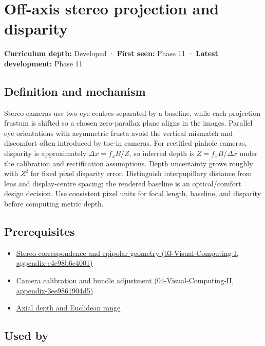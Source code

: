\hypertarget{appendix-0976e86e5b9f}{}
\section{Off-axis stereo projection and disparity}\label{appendix-0976e86e5b9f-off-axis-stereo-projection-and-disparity}

\textbf{Curriculum depth:} Developed · \textbf{First seen:} Phase 11 · \textbf{Latest development:} Phase 11

\subsection{Definition and mechanism}\label{appendix-0976e86e5b9f-definition-and-mechanism}

Stereo cameras use two eye centres separated by a baseline, while each projection frustum is shifted so a chosen zero-parallax plane aligns in the images. Parallel eye orientations with asymmetric frusta avoid the vertical mismatch and discomfort often introduced by toe-in cameras. For rectified pinhole cameras, disparity is approximately \(\Delta x=f_xB/Z\), so inferred depth is \(Z=f_xB/\Delta x\) under the calibration and rectification assumptions. Depth uncertainty grows roughly with \(Z^2\) for fixed pixel disparity error. Distinguish interpupillary distance from lens and display-centre spacing; the rendered baseline is an optical/comfort design decision. Use consistent pixel units for focal length, baseline, and disparity before computing metric depth.

\subsection{Prerequisites}\label{appendix-0976e86e5b9f-prerequisites}

\begin{itemize}
\tightlist
\item
  \href{../03-Visual-Computing-I/main.pdf\#nameddest=appendix-c4e98b6e4001}{Stereo correspondence and epipolar geometry (03-Visual-Computing-I, appendix-c4e98b6e4001)}
\item
  \href{../04-Visual-Computing-II/main.pdf\#nameddest=appendix-3ee9861904d5}{Camera calibration and bundle adjustment (04-Visual-Computing-II, appendix-3ee9861904d5)}
\item
  \hyperref[appendix-cac01ebeeb11]{Axial depth and Euclidean range}
\end{itemize}

\subsection{Used by}\label{appendix-0976e86e5b9f-used-by}

